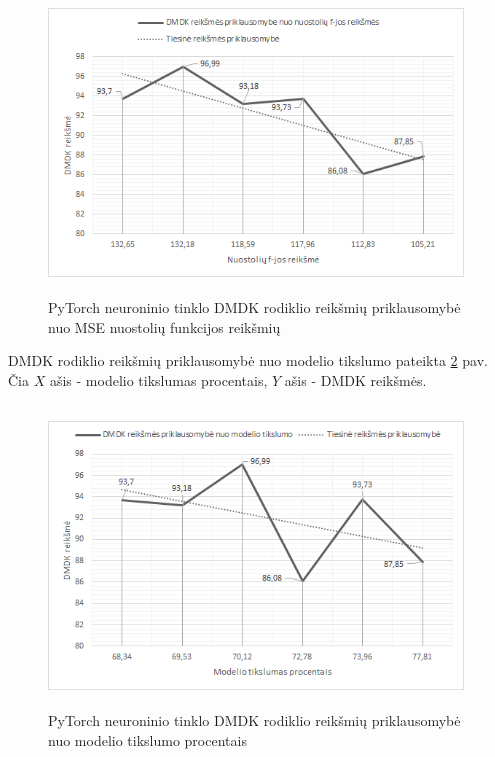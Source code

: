\documentclass{VUMIFInfBakalaurinis}
\begin{document}
\begin{figure}[h]
  \centering
  \includegraphics[width=11cm,height=8cm,keepaspectratio]{img/pap_tyr_1.png}
  \caption{PyTorch neuroninio tinklo DMDK rodiklio reikšmių priklausomybė nuo MSE nuostolių funkcijos reikšmių}
  \label{fig:PyTorch neuroninio tinklo DMDK rodiklio reikšmių priklausomybė nuo MSE nuostolių funkcijos reikšmių}
\end{figure}

\par DMDK rodiklio reikšmių priklausomybė nuo modelio tikslumo pateikta \ref{fig:PyTorch neuroninio tinklo DMDK rodiklio reikšmių priklausomybė nuo modelio tikslumo procentais} pav. Čia $X$ ašis - modelio tikslumas procentais, $Y$ ašis - DMDK reikšmės.

\begin{figure}[h]
  \centering
  \includegraphics[width=11cm,height=8cm,keepaspectratio]{img/pap_tyr_2.png}
  \caption{PyTorch neuroninio tinklo DMDK rodiklio reikšmių priklausomybė nuo modelio tikslumo procentais}
  \label{fig:PyTorch neuroninio tinklo DMDK rodiklio reikšmių priklausomybė nuo modelio tikslumo procentais}
\end{figure}
\end{document}
